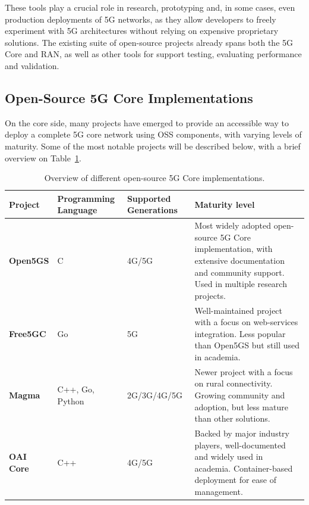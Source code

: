 These tools play a crucial role in research, prototyping and, in some cases, even production deployments of 5G networks, as they allow developers to freely experiment with 5G architectures without relying on expensive proprietary solutions. The existing suite of open-source projects already spans both the 5G Core and \gls{RAN}, as well as other tools for support testing, evaluating performance and validation.

\subsection{Open-Source 5G Core Implementations}
\label{sec:open_source_5g_core_implementations}
On the core side, many projects have emerged to provide an accessible way to deploy a complete 5G core network using \gls{OSS} components, with varying levels of maturity. Some of the most notable projects will be described below, with a brief overview on Table~\ref{tab:5gcore_implementations}.

\begin{table}[htbp]
\centering
\footnotesize
\begin{tabularx}{\textwidth}{|l|p{2.2cm}|p{2.1cm}|p{7.5cm}|}
\hline
\rowcolor{gray!30} 
\textbf{Project} & \textbf{Programming Language} & \textbf{Supported Generations} & \textbf{Maturity level}\\ \hline
\textbf{Open5GS} & C & 4G/5G & Most widely adopted open-source 5G Core implementation, with extensive documentation and community support. Used in multiple research projects. \\ \hline
\textbf{Free5GC} & Go & 5G & Well-maintained project with a focus on web-services integration. Less popular than Open5GS but still used in academia.\\ \hline
\textbf{Magma} & C++, Go, Python & 2G/3G/4G/5G & Newer project with a focus on rural connectivity. Growing community and adoption, but less mature than other solutions.\\ \hline
\textbf{\gls{OAI} Core} & C++ & 4G/5G & Backed by major industry players, well-documented and widely used in academia. Container-based deployment for ease of management.\\ \hline
\end{tabularx}
\caption{Overview of different open-source 5G Core implementations.}
\label{tab:5gcore_implementations}
\end{table}

